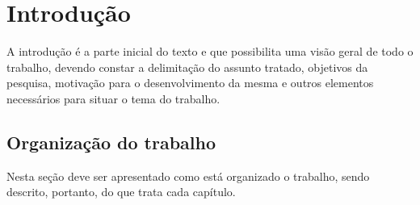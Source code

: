 \chapter{Introdução}

A introdução é a parte inicial do texto e que possibilita uma visão geral de todo o trabalho, devendo constar a delimitação do assunto tratado, objetivos da pesquisa, motivação para o desenvolvimento da mesma e outros elementos necessários para situar o tema do trabalho.

\section{Organização do trabalho}

Nesta seção deve ser apresentado como está organizado o trabalho, sendo descrito, portanto, do que trata cada capítulo.
